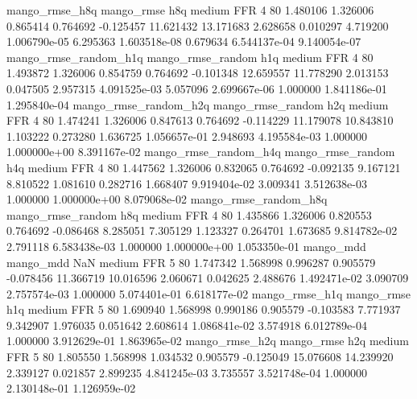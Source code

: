        mango_rmse_h8q        mango_rmse                  h8q     medium      FFR                 4 80  1.480106       1.326006 0.865414       0.764692   -0.125457     11.621432     13.171683     2.628658       0.010297  4.719200 1.006790e-05     6.295363   1.603518e-08            0.679634    6.544137e-04        9.140054e-07
mango_rmse_random_h1q mango_rmse_random                  h1q     medium      FFR                 4 80  1.493872       1.326006 0.854759       0.764692   -0.101348     12.659557     11.778290     2.013153       0.047505  2.957315 4.091525e-03     5.057096   2.699667e-06            1.000000    1.841186e-01        1.295840e-04
mango_rmse_random_h2q mango_rmse_random                  h2q     medium      FFR                 4 80  1.474241       1.326006 0.847613       0.764692   -0.114229     11.179078     10.843810     1.103222       0.273280  1.636725 1.056657e-01     2.948693   4.195584e-03            1.000000    1.000000e+00        8.391167e-02
mango_rmse_random_h4q mango_rmse_random                  h4q     medium      FFR                 4 80  1.447562       1.326006 0.832065       0.764692   -0.092135      9.167121      8.810522     1.081610       0.282716  1.668407 9.919404e-02     3.009341   3.512638e-03            1.000000    1.000000e+00        8.079068e-02
mango_rmse_random_h8q mango_rmse_random                  h8q     medium      FFR                 4 80  1.435866       1.326006 0.820553       0.764692   -0.086468      8.285051      7.305129     1.123327       0.264701  1.673685 9.814782e-02     2.791118   6.583438e-03            1.000000    1.000000e+00        1.053350e-01
            mango_mdd         mango_mdd                  NaN     medium      FFR                 5 80  1.747342       1.568998 0.996287       0.905579   -0.078456     11.366719     10.016596     2.060671       0.042625  2.488676 1.492471e-02     3.090709   2.757574e-03            1.000000    5.074401e-01        6.618177e-02
       mango_rmse_h1q        mango_rmse                  h1q     medium      FFR                 5 80  1.690940       1.568998 0.990186       0.905579   -0.103583      7.771937      9.342907     1.976035       0.051642  2.608614 1.086841e-02     3.574918   6.012789e-04            1.000000    3.912629e-01        1.863965e-02
       mango_rmse_h2q        mango_rmse                  h2q     medium      FFR                 5 80  1.805550       1.568998 1.034532       0.905579   -0.125049     15.076608     14.239920     2.339127       0.021857  2.899235 4.841245e-03     3.735557   3.521748e-04            1.000000    2.130148e-01        1.126959e-02
